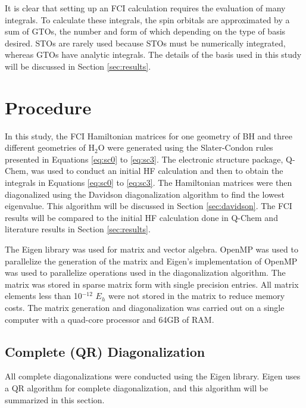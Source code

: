 \documentclass[final,3p,times,twocolumn]{elsarticle}
\begin{document}
It is clear that setting up an FCI calculation requires the evaluation of many integrals. To calculate these integrals, the spin orbitals are approximated by a sum of GTOs,\cite{gto} the number and form of which depending on the type of basis desired. STOs are rarely used because STOs must be numerically integrated, whereas GTOs have analytic integrals.\cite{szabo} The details of the basis used in this study will be discussed in Section \ref{sec:results}.

\section{Procedure}

In this study, the FCI Hamiltonian matrices for one geometry of BH and three different geometries of H$_2$O were generated using the Slater-Condon rules presented in Equations \eqref{eq:sc0} to \eqref{eq:sc3}. The electronic structure package, Q-Chem,\cite{qchem} was used to conduct an initial HF calculation and then to obtain the integrals in Equations \eqref{eq:sc0} to \eqref{eq:sc3}. The Hamiltonian matrices were then diagonalized using the Davidson diagonalization algorithm\cite{davidson,liu} to find the lowest eigenvalue. This algorithm will be discussed in Section \ref{sec:davidson}. The FCI results will be compared to the initial HF calculation done in Q-Chem and literature results\cite{cccbdb,handy-1983} in Section \ref{sec:results}.

The Eigen library was used for matrix and vector algebra.\cite{eigen} OpenMP was used to parallelize the generation of the matrix and Eigen's implementation of OpenMP was used to parallelize operations used in the diagonalization algorithm.\cite{openmp} The matrix was stored in sparse matrix form with single precision entries. All matrix elements less than 10$^{-12}$ $E_h$ were not stored in the matrix to reduce memory costs. %
The matrix generation and diagonalization was carried out on a single computer with a quad-core processor and 64GB of RAM.


\subsection{Complete (QR) Diagonalization} \label{sec:qr}
All complete diagonalizations were conducted using the Eigen library.\cite{eigen} Eigen uses a QR algorithm\cite{qr} for complete diagonalization, and this algorithm will be summarized in this section.
\end{document}
